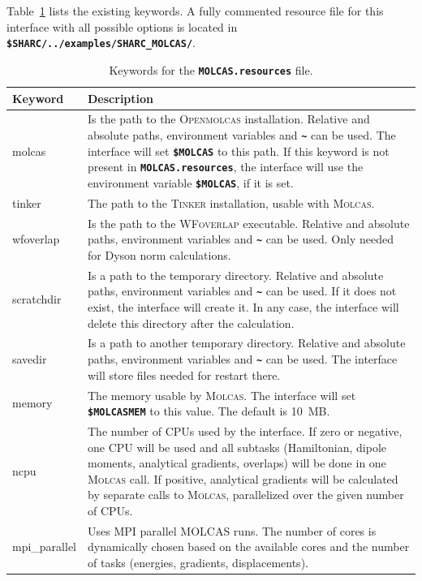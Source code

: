 \documentclass[a4paper,10pt,DIV=15,openany]{scrbook}
\newcommand{\ttt}[1]{\textbf{\texttt{#1}}}
\begin{document}
Table~\ref{tab:molcas_sh2} lists the existing keywords.
A fully commented resource file for this interface with all possible options is located in \ttt{\$SHARC/../examples/SHARC\_MOLCAS/}.

\begin{table}
  \centering
  \caption{Keywords for the \ttt{MOLCAS.resources} file.}
  \label{tab:molcas_sh2}
  \begin{tabular}{>{\ttfamily}lp{12cm}}
  \hline
  Keyword       &Description\\
  \hline
molcas          &Is the path to the \textsc{Openmolcas} installation. Relative and absolute paths, environment variables and \ttt{\textasciitilde} can be used. The interface will set \ttt{\$MOLCAS} to this path. If this keyword is not present in \ttt{MOLCAS.resources}, the interface will use the environment variable \ttt{\$MOLCAS}, if it is set.\\
tinker          &The path to the \textsc{Tinker} installation, usable with \textsc{Molcas}.\\
wfoverlap       &Is the path to the \textsc{WFoverlap} executable. Relative and absolute paths, environment variables and \ttt{\textasciitilde} can be used. Only needed for Dyson norm calculations.\\
scratchdir      &Is a path to the temporary directory. Relative and absolute paths, environment variables and \ttt{\textasciitilde} can be used. If it does not exist, the interface will create it. In any case, the interface will delete this directory after the calculation.\\
savedir         &Is a path to another temporary directory.  Relative and absolute paths, environment variables and \ttt{\textasciitilde} can be used. The interface will store files needed for restart there.\\
memory          &The memory usable by \textsc{Molcas}. The interface will set \ttt{\$MOLCASMEM} to this value. The default is 10~MB.\\
ncpu            &The number of CPUs used by the interface. If zero or negative, one CPU will be used and all subtasks (Hamiltonian, dipole moments, analytical gradients, overlaps) will be done in one \textsc{Molcas} call. If positive, analytical gradients will be calculated by separate calls to \textsc{Molcas}, parallelized over the given number of CPUs. \\
mpi\_parallel   &Uses MPI parallel MOLCAS runs. The number of cores is dynamically chosen based on the available cores and the number of tasks (energies, gradients, displacements).\\

\end{tabular}
\end{table}
\end{document}
